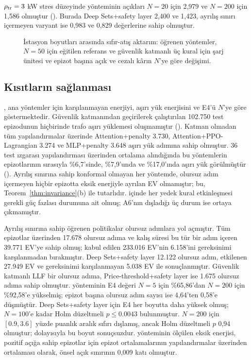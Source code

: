 $\rho_{\mathrm{tr}}=3$ kW stres düzeyinde \method{} yönteminin açıkları $N=20$ için 2,979 ve $N=200$ için 1,586 olmuştur ().
Burada Deep Sets+safety layer 2,400 ve 1,423, ayrılış sınırı içermeyen varyant ise 0,983 ve 0,829 değerlerine sahip olmuştur.

\begin{figure}[t]
\centering
{}
\caption{İstasyon boyutları arasında sıfır-atış aktarım: öğrenen yöntemler, $N=50$ için eğitilen referans ve güvenlik katmanlı üç kural için şarj ünitesi ve epizot başına açık ve cezalı kârın $N$'ye göre değişimi.}
\label{fig:zeroshot}
\end{figure}

\subsection{Kısıtların sağlanması}\label{sec:res-constraints}

, ana yöntemler için karşılanmayan enerjiyi, aşırı yük enerjisini ve E4'ü $N$'ye göre göstermektedir.
Güvenlik katmanından geçirilerek çalıştırılan 102.750 test epizodunun hiçbirinde trafo aşırı yüklemesi oluşmamıştır ().
Katman olmadan tüm yapılandırmalar üzerinde Attention+penalty 3.730, Attention+PPO-Lagrangian 3.274 ve MLP+penalty 3.648 aşırı yük adımına sahip olmuştur.
36 test ızgarası yapılandırması üzerinden ortalama alındığında bu yöntemlerin epizotlarının sırasıyla \%6,7'sinde, \%7,9'unda ve \%17,0'ında aşırı yük görülmüştür ().
Ayrılış sınırına sahip konformal olmayan her yöntemde, olursuz adım içermeyen hiçbir epizotta eksik enerjiyle ayrılan EV olmamıştır; bu, Teorem~\ref{thm:invariance}(b) ile tutarlıdır.
 içinde her yedek kural etkinleşmesi gerekli güç fazlası durumuna ait olmuş; A6'nın dışladığı üç durum ise ortaya çıkmamıştır.

Ayrılış sınırına sahip öğrenen politikalar olursuz adımlara yol açmıştır.
Tüm epizotlar üzerinden \method{} 17.678 olursuz adıma ve kalış süresi bu tür bir adım içeren 39.771 EV'ye sahip olmuş; kabul edilen 233.016 EV'nin 6.158'ini gereksinimi karşılanmadan bırakmıştır.
Deep Sets+safety layer 12.122 olursuz adım, etkilenen 27.949 EV ve gereksinimi karşılanmayan 5.038 EV ile sonuçlanmıştır.
Güvenlik katmanlı LLF bir olursuz adıma, Price-threshold+safety layer ise 1.675 olursuz adıma sahip olmuştur.
\method{} yönteminin E4 değeri $N=5$ için \%65,86'dan $N=200$ için \%92,58'e yükselmiş; epizot başına olursuz adım sayısı ise 4,64'ten 0,58'e düşmüştür.
Deep Sets+safety layer için E4 her boyutta daha yüksek olmuş; $N=100$'e kadar Holm düzeltmeli $p\le0.0043$ bulunmuştur.
$N=200$ için $[0.9,3.6]$ yüzde puanlık aralık sıfırı dışlamış, ancak Holm düzeltmeli $p$ 0,94 olmuştur; dolayısıyla bu boyut sonuçsuzdur.
\method{} yönteminin ölçülen eksik enerjisi, pozitif açığa sahip epizotlar için epizot ortalamalarının yapılandırmalar üzerinden ortalaması olarak, önsel açık sınırının 0,009 katı olmuştur.

